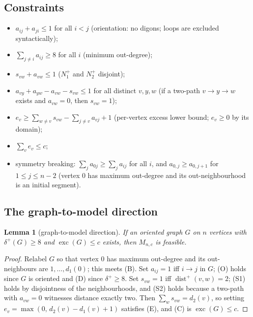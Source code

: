 \documentclass[11pt]{amsart}
\newtheorem{lemma}[theorem]{Lemma}
\theoremstyle{remark}
\newcommand{\exc}{\operatorname{exc}}
\begin{document}
\subsection*{Constraints}
\begin{itemize}
\item[(O)] $a_{ij} + a_{ji} \le 1$ for all $i < j$ \hfill (orientation: no
  digons; loops are excluded syntactically);
\item[(D)] $\sum_{j \ne i} a_{ij} \ge 8$ for all $i$ \hfill (minimum
  out-degree);
\item[(S1)] $s_{vw} + a_{vw} \le 1$ \hfill ($N_1^+$ and $N_2^+$ disjoint);
\item[(S2)] $a_{vy} + a_{yw} - a_{vw} - s_{vw} \le 1$ for all distinct
  $v, y, w$ \hfill (if a two-path $v \to y \to w$ exists and $a_{vw} = 0$,
  then $s_{vw} = 1$);
\item[(E)] $e_v \ge \sum_{w \ne v} s_{vw} - \sum_{j \ne v} a_{vj} + 1$
  \hfill (per-vertex excess lower bound; $e_v \ge 0$ by its domain);
\item[(C)] $\sum_v e_v \le c$;
\item[(B)] symmetry breaking: $\sum_j a_{0j} \ge \sum_j a_{ij}$ for all
  $i$, and $a_{0,j} \ge a_{0,j+1}$ for $1 \le j \le n-2$ \hfill (vertex 0
  has maximum out-degree and its out-neighbourhood is an initial segment).
\end{itemize}

\subsection*{The graph-to-model direction}
\begin{lemma}[graph-to-model direction]\label{lem:encoding}
If an oriented graph $G$ on $n$ vertices with $\delta^+(G) \ge 8$ and
$\exc(G) \le c$ exists, then $M_{n,c}$ is feasible.
\end{lemma}

\begin{proof}
Relabel $G$ so that vertex $0$ has maximum out-degree and its
out-neighbours are $1, \dots, d_1(0)$; this meets (B). Set $a_{ij} = 1$
iff $i \to j$ in $G$; (O) holds since $G$ is oriented and (D) since
$\delta^+ \ge 8$. Set $s_{vw} = 1$ iff $\operatorname{dist}^+(v,w) = 2$;
(S1) holds by disjointness of the neighbourhoods, and (S2) holds because a
two-path with $a_{vw} = 0$ witnesses distance exactly two. Then
$\sum_w s_{vw} = d_2(v)$, so setting
$e_v = \max(0,\, d_2(v) - d_1(v) + 1)$ satisfies (E), and (C) is
$\exc(G) \le c$.
\end{proof}
\end{document}
